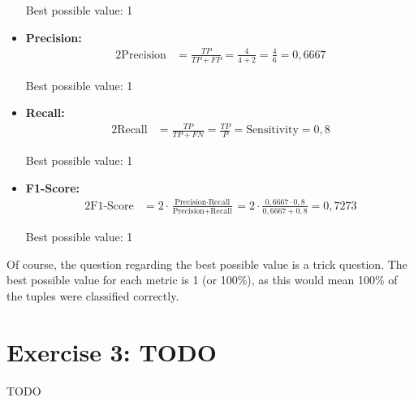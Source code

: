 \documentclass[
english,
smallborders
]{i6prcsht}
\begin{document}
\begin{solution}
\begin{itemize}
		      Best possible value: 1
		\item \textbf{Precision:}
		      \begin{alignat*}{2}
			      \text{Precision} & = \frac{TP}{TP + FP} = \frac{4}{4 + 2} = \frac{4}{6} = 0,6667
		      \end{alignat*}

		      Best possible value: 1
		\item \textbf{Recall:}
		      \begin{alignat*}{2}
			      \text{Recall} & = \frac{TP}{TP + FN} = \frac{TP}{P} = \text{Sensitivity} = 0,8
		      \end{alignat*}

		      Best possible value: 1
		\item \textbf{F1-Score:}
		      \begin{alignat*}{2}
			      \text{F1-Score} & = 2 \cdot \frac{\text{Precision} \cdot \text{Recall}}{\text{Precision} + \text{Recall}} = 2 \cdot \frac{0,6667 \cdot 0,8}{0,6667 + 0,8} = 0,7273
		      \end{alignat*}

		      Best possible value: 1
	\end{itemize}

	Of course, the question regarding the best possible value is a trick question. The best possible value for each metric is 1 (or 100\%), as this would mean 100\% of the tuples were classified correctly.


\end{solution}

\newpage

\section*{Exercise 3: TODO}

TODO
\end{document}
